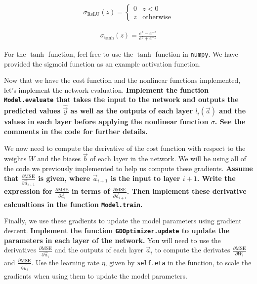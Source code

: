 \begin{Parts}
\begin{align*}
\sigma_{\text{ReLU}}(z)=\begin{cases}0 & z<0 \\ z & \text{otherwise}\end{cases}
\end{align*}

\begin{align*}
\sigma_{\text{tanh}}(z)=\frac{e^z-e^{-z}}{e^z+e^{-z}}
\end{align*}

For the $\tanh$ function, feel free to use the $\tanh$ function in \texttt{numpy}.  We have provided the sigmoid function as an example activation function.



\Part Now that we have the cost function and the nonlinear functions implemented, let's implement the network evaluation.  \textbf{Implement the function \texttt{Model.evaluate} that takes the input to the network and outputs the predicted values $\hat{\vec{y}}$ as well as the outputs of each layer $l_i(\vec{a})$ and the values in each layer before applying the nonlinear function $\sigma$.  See the comments in the code for further details.}



\Part We now need to compute the derivative of the cost function with respect to the weights $W$ and the biases $\vec{b}$ of each layer in the network.  We will be using all of the code we previously implemented to help us compute these gradients.  \textbf{Assume that $\frac{\partial\text{MSE}}{\partial\vec{a}_{i+1}}$ is given, where $\vec{a}_{i+1}$ is the input to layer $i+1$.  Write the expression for $\frac{\partial\text{MSE}}{\partial \vec{a}_i}$ in terms of $\frac{\partial\text{MSE}}{\partial\vec{a}_{i+1}}$.  Then implement these derivative calcualtions in the function \texttt{Model.train}.}



\Part Finally, we use these gradients to update the model parameters using gradient descent.  \textbf{Implement the function \texttt{GDOptimizer.update} to update the parameters in each layer of the network.}  You will need to use the derivatives $\frac{\partial\text{MSE}}{\partial \vec{a}_i}$ and the outputs of each layer $\vec{a}_i$ to compute the derivates $\frac{\partial\text{MSE}}{\partial W_i}$ and $\frac{\partial\text{MSE}}{\partial \vec{b}_i}$.  Use the learning rate $\eta$, given by \texttt{self.eta} in the function, to scale the gradients when using them to update the model parameters.




\end{Parts}
